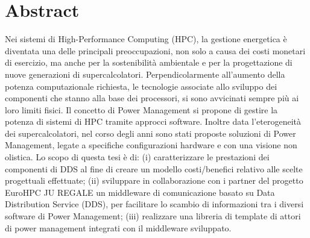 \section*{Abstract}
Nei sistemi di High-Performance Computing (HPC), la gestione energetica è diventata una delle principali preoccupazioni, non solo a causa dei costi monetari di esercizio, ma anche per la sostenibilità ambientale e per la progettazione di nuove generazioni di supercalcolatori\cite{growth}. Perpendicolarmente all'aumento della potenza computazionale richiesta, le tecnologie associate allo sviluppo dei componenti che stanno alla base dei processori, si sono avvicinati sempre più ai loro limiti fisici. Il concetto di Power Management si propone di gestire la potenza di sistemi di HPC tramite approcci software. Inoltre data l'eterogeneità dei supercalcolatori, nel corso degli anni sono stati proposte soluzioni di Power Management, legate a specifiche configurazioni hardware e con una visione non olistica. %
Lo scopo di questa tesi è di: (i)  caratterizzare le prestazioni dei componenti di DDS al fine di creare un modello costi/benefici relativo alle scelte progettuali effettuate; (ii) sviluppare in collaborazione con i partner del progetto EuroHPC JU REGALE un middleware di comunicazione basato su Data Distribution Service (DDS), per facilitare lo scambio di informazioni tra i diversi software di Power Management; (iii) realizzare una libreria di template di attori di power management integrati con il middleware sviluppato.


